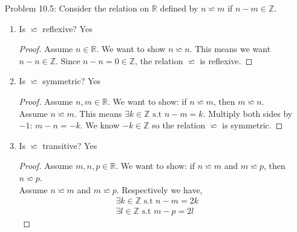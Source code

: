 \documentclass{article}
\theoremstyle{claim}
\theoremstyle{definition}
\begin{document}
\begin{enumerate}
\begin{enumerate}
\begin{proof}
\begin{gather*}
                    a + 2b + c = 2k + 2l\\
                    a + c = 2k + 2l - 2b\\
                    a + c = 2(k + l - b)
                \end{gather*}
                We know $(k + l - b) \in \mathbb{Z}$. So the relation $R$ is transitive.
                \end{proof}
            \item Does $\mathcal{R}$ have trichotomy? No since $\mathcal{R}$ is symmetric.
        \end{enumerate}
    \item[Problem 10.5:] Consider the relation on $\mathbb{R}$ defined by $n \backsimeq m$ if $n - m \in \mathbb{Z}$.
        \begin{enumerate}
            \item Is $\backsimeq$ reflexive? Yes
                \begin{proof}
                    Assume $n\in \mathbb{R}$. We want to show $n \backsimeq n$. This means we want $n - n \in \mathbb{Z}$. Since $n - n = 0 \in \mathbb{Z}$, the relation $\backsimeq$ is reflexive.
                \end{proof}
            \item Is $\backsimeq$ symmetric? Yes
                \begin{proof}
                    Assume $n, m \in \mathbb{R}$. We want to show: if $n \backsimeq m$, then $m \backsimeq n$.\\
                    Assume $n \backsimeq m$. This means $\exists k \in \mathbb{Z} \text{ s.t } n - m = k$. Multiply both sides by $-1$: $m - n = -k$. We know $-k \in \mathbb{Z}$ so the relation $\backsimeq$ is symmetric.
                \end{proof}
            \item Is $\backsimeq$ transitive? Yes
                \begin{proof}
                    Assume $m, n, p \in \mathbb{R}$. We want to show: if $n \backsimeq m$ and $m \backsimeq p$, then $n \backsimeq p$.\\
                    Assume $n \backsimeq m$ and $m \backsimeq p$. Respectively we have,
                    \begin{gather*}
                        \exists k \in \mathbb{Z} \text{ s.t } n - m = 2k\\
                        \exists l \in \mathbb{Z} \text{ s.t } m - p = 2l
                    \end{gather*}

\end{proof}
\end{enumerate}
\end{enumerate}
\end{document}
